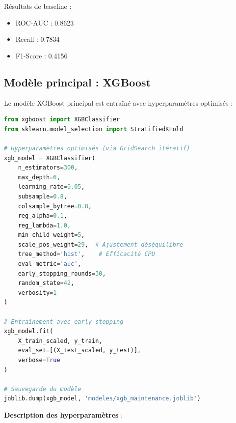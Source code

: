 \documentclass[a4paper,12pt,twoside]{report}
\begin{document}
Résultats de baseline :
\begin{itemize}
    \item ROC-AUC : 0.8623
    \item Recall : 0.7834
    \item F1-Score : 0.4156
\end{itemize}

\subsection{Modèle principal : XGBoost}

Le modèle XGBoost principal est entraîné avec hyperparamètres optimisés :

\begin{lstlisting}[language=Python]
from xgboost import XGBClassifier
from sklearn.model_selection import StratifiedKFold

# Hyperparamètres optimisés (via GridSearch itératif)
xgb_model = XGBClassifier(
    n_estimators=300,
    max_depth=6,
    learning_rate=0.05,
    subsample=0.8,
    colsample_bytree=0.8,
    reg_alpha=0.1,
    reg_lambda=1.0,
    min_child_weight=5,
    scale_pos_weight=29,  # Ajustement déséquilibre
    tree_method='hist',    # Efficacité CPU
    eval_metric='auc',
    early_stopping_rounds=30,
    random_state=42,
    verbosity=1
)

# Entraînement avec early stopping
xgb_model.fit(
    X_train_scaled, y_train,
    eval_set=[(X_test_scaled, y_test)],
    verbose=True
)

# Sauvegarde du modèle
joblib.dump(xgb_model, 'modeles/xgb_maintenance.joblib')
\end{lstlisting}

\textbf{Description des hyperparamètres} :
\end{document}
